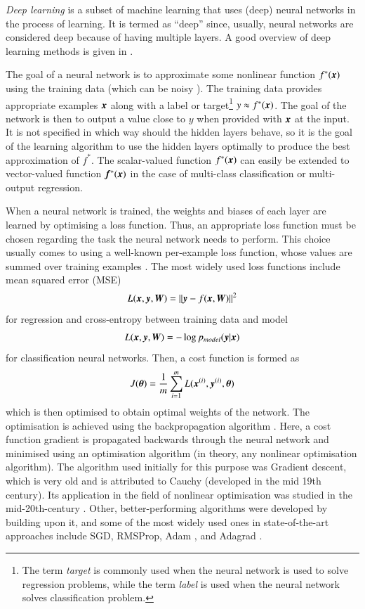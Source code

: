 \emph{Deep learning} is a subset of machine learning that uses (deep) neural networks in the process of learning. It is termed as ``deep'' since, usually, neural networks are considered deep because of having multiple layers. A good overview of deep learning methods is given in \cite{Haykin1999,Schmidhuber2015,Goodfellow2016}.

The goal of a neural network is to approximate some nonlinear function $f^{*}({\bm{x}})$ using the training data (which can be noisy \cite{Goodfellow2016}). The training data provides appropriate examples ${\bm{x}}$ along with a label or target\footnote{The term \emph{target} is commonly used when the neural network is used to solve regression problems, while the term \emph{label} is used when the neural network solves classification problem.} $y\approx f^{*}({\bm{x}})$. The goal of the network is then to output a value close to $y$ when provided with ${\bm{x}}$ at the input. It is not specified in which way should the hidden layers behave, so it is the goal of the learning algorithm to use the hidden layers optimally to produce the best approximation of $f^{*}$. The scalar-valued function $f^*({\bm{x}})$ can easily be extended to vector-valued function ${\bm{f}}^*({\bm{x}})$ in the case of multi-class classification or multi-output regression.

When a neural network is trained, the weights and biases of each layer are learned by optimising a loss function. Thus, an appropriate loss function must be chosen regarding the task the neural network needs to perform. This choice usually comes to using a well-known per-example loss function, whose values are summed over training examples \cite{Goodfellow2016}. The most widely used loss functions include mean squared error (MSE)
\[
    L({\bm{x}},{\bm{y}},{\bm{W}}) = ||{\bm{y}}-f({\bm{x}},{\bm{W}})||^2
\]
for regression and cross-entropy between training data and model
\[
    L({\bm{x}},{\bm{y}},{\bm{W}}) = -\log p_{model}({\bm{y}}|{\bm{x}})
\]
for classification neural networks. Then, a cost function is formed as
\[
    J({\bm{\theta}}) = \frac{1}{m}\sum_{i=1}^m L({\bm{x}}^{(i)}, {\bm{y}}^{(i)}, {\bm{\theta}})
    \label{Eq:CostFunction}\\
\]
which is then optimised to obtain optimal weights of the network. The optimisation is achieved using the backpropagation algorithm \cite{Rumelhart1986}. Here, a cost function gradient is propagated backwards through the neural network and minimised using an optimisation algorithm (in theory, any nonlinear optimisation algorithm). The algorithm used initially for this purpose was Gradient descent, which is very old and is attributed to Cauchy (developed in the mid 19th century). Its application in the field of nonlinear optimisation was studied in the mid-20th-century \cite{Curry1944}. Other, better-performing algorithms were developed by building upon it, and some of the most widely used ones in state-of-the-art approaches include SGD, RMSProp, Adam \cite{Kingma2014}, and Adagrad \cite{Duchi2011}.

